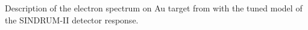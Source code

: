 \vspace{0.2in}
%
 {
  \label{fig:ana_step1_best_dio_fit}
  Description of the electron spectrum on Au target from \cite{sindrum_ii:Bertl2006}
  with the tuned model of the SINDRUM-II detector response.
}
